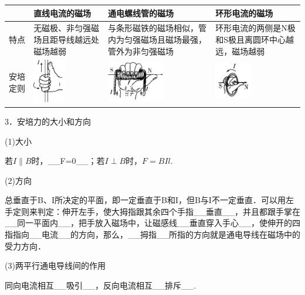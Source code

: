 \documentclass[cn,10.5pt,chinese,mac,chinesefont=founder]{elegantbook}
\begin{document}
\begin{longtable}[]{@{}m{2cm}m{3cm}m{3cm}m{3cm}@{}}
\toprule
 & \begin{minipage}[b]{0.22\columnwidth}\raggedright
直线电流的磁场\strut
\end{minipage} & \begin{minipage}[b]{0.22\columnwidth}\raggedright
通电螺线管的磁场\strut
\end{minipage} & \begin{minipage}[b]{0.22\columnwidth}\raggedright
环形电流的磁场\strut
\end{minipage}\tabularnewline
\midrule
\endhead
特点 & 无磁极、非匀强磁场且距导线越远处磁场越弱 &
与条形磁铁的磁场相似，管内为匀强磁场且磁场最强，管外为非匀强磁场 &
环形电流的两侧是N极和S极且离圆环中心越远，磁场越弱\tabularnewline
安培定则 &
\includegraphics[width=0.54722in,height=0.75486in]{media/image336.png} &
\includegraphics[width=0.98125in,height=0.68889in]{media/image337.png} &
\includegraphics[width=0.63194in,height=0.61319in]{media/image338.png}\tabularnewline
\bottomrule
\end{longtable}

3．安培力的大小和方向

(1)大小

若$I\parallel B$时，\_\_F=0\_\_；若$I\perp B$时，$F=BIl$.

(2)方向

总垂直于B、I所决定的平面，即一定垂直于B和I，但B与I不一定垂直．可以用左手定则来判定：伸开左手，使大拇指跟其余四个手指\_\_垂直\_\_，并且都跟手掌在\_\_同一平面内\_\_，把手放入磁场中，让磁感线\_\_垂直穿入手心\_\_，使伸开的四指指向\_\_电流\_\_的方向，那么，\_\_拇指\_\_所指的方向就是通电导线在磁场中的受力方向．

(3)两平行通电导线间的作用

同向电流相互\_\_吸引\_\_，反向电流相互\_\_排斥\_\_.
\end{document}
